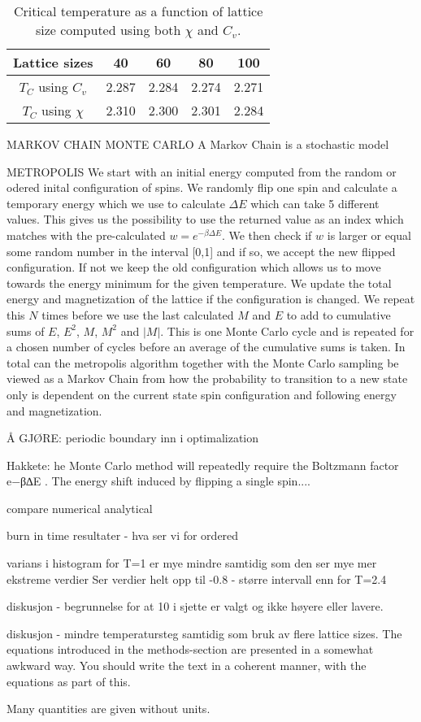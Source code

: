 \documentclass[english,notitlepage,reprint,nofootinbib]{revtex4-1}  %
\begin{document}
\begin{table}
    \centering
    \caption{Critical temperature as a function of lattice size computed using both $\chi$ and $C_v$.}
    \label{tab:critical_T}
    \begin{tabular}{|c|c|c|c|c|}
        \hline
        Lattice sizes      & 40    & 60    & 80    & 100   \\
        \hline
        $T_C$ using $C_v$  & 2.287 & 2.284 & 2.274 & 2.271 \\
        \hline
        $T_C$ using $\chi$ & 2.310 & 2.300 & 2.301 & 2.284 \\
        \hline
    \end{tabular}
\end{table}

MARKOV CHAIN MONTE CARLO
A Markov Chain is a stochastic model

METROPOLIS
We start with an initial energy computed from the random or odered inital configuration of spins. We randomly flip one spin and calculate a temporary energy which we use to calculate $\Delta E$ which can take 5 different values. This gives us the possibility to use the returned value as an index which matches with the pre-calculated $w= e^{-\beta \Delta E}$. We then check if $w$ is larger or equal some random number in the interval [0,1] and if so, we accept the new flipped configuration. If not we keep the old configuration which allows us to move towards the energy minimum for the given temperature. We update the total energy and magnetization of the lattice if the configuration is changed. We repeat this $N$ times before we use the last calculated $M$ and $E$ to add to cumulative sums of $E$, $E^2$, $M$, $M^2$ and $|M|$. This is one Monte Carlo cycle and is repeated for a chosen number of cycles before an average of the cumulative sums is taken. In total can the metropolis algorithm together with the Monte Carlo sampling be viewed as a Markov Chain from how the probability to transition to a new state only is dependent on the current state spin configuration and following energy and magnetization.



Å GJØRE:
periodic boundary inn i optimalization

Hakkete: he Monte Carlo method will repeatedly require the
Boltzmann factor e−β∆E . The energy shift induced by
flipping a single spin....

compare numerical analytical

burn in time resultater - hva ser vi for ordered

varians i histogram for T=1 er mye mindre samtidig som den ser mye mer ekstreme verdier Ser verdier helt opp til -0.8 - større intervall enn for T=2.4

diskusjon - begrunnelse for at 10 i sjette er valgt og ikke høyere eller lavere.

diskusjon - mindre temperatursteg samtidig som bruk av flere lattice sizes.
The equations introduced in the methods-section are presented in a somewhat awkward way. You should write the text in a coherent manner, with the equations as part of this.

Many quantities are given without units.
\end{document}
